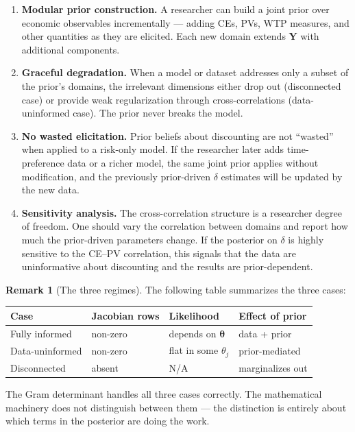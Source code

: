 \documentclass[11pt,a4paper]{article}
\theoremstyle{definition}
\newtheorem{remark}[theorem]{Remark}
\newcommand{\btheta}{\boldsymbol{\theta}}
\begin{document}
\begin{enumerate}
    \item \textbf{Modular prior construction.} A researcher can build a joint
    prior over economic observables incrementally --- adding CEs, PVs, WTP
    measures, and other quantities as they are elicited. Each new domain
    extends $\mathbf{Y}$ with additional components.

    \item \textbf{Graceful degradation.} When a model or dataset addresses
    only a subset of the prior's domains, the irrelevant dimensions either
    drop out (disconnected case) or provide weak regularization through
    cross-correlations (data-uninformed case). The prior never breaks the
    model.

    \item \textbf{No wasted elicitation.} Prior beliefs about discounting are
    not ``wasted'' when applied to a risk-only model. If the researcher later
    adds time-preference data or a richer model, the same joint prior applies
    without modification, and the previously prior-driven $\delta$ estimates
    will be updated by the new data.

    \item \textbf{Sensitivity analysis.} The cross-correlation structure is
    a researcher degree of freedom. One should vary the correlation between
    domains and report how much the prior-driven parameters change. If the
    posterior on $\delta$ is highly sensitive to the CE--PV correlation, this
    signals that the data are uninformative about discounting and the
    results are prior-dependent.
\end{enumerate}

\begin{remark}[The three regimes]
The following table summarizes the three cases:
\begin{center}
\begin{tabular}{llll}
\toprule
Case & Jacobian rows & Likelihood & Effect of prior \\
\midrule
Fully informed & non-zero & depends on $\btheta$ & data + prior \\
Data-uninformed & non-zero & flat in some $\theta_j$ &
    prior-mediated \\
Disconnected & absent & N/A & marginalizes out \\
\bottomrule
\end{tabular}
\end{center}
The Gram determinant handles all three cases correctly. The mathematical
machinery does not distinguish between them --- the distinction is entirely
about which terms in the posterior are doing the work.
\end{remark}
\end{document}
